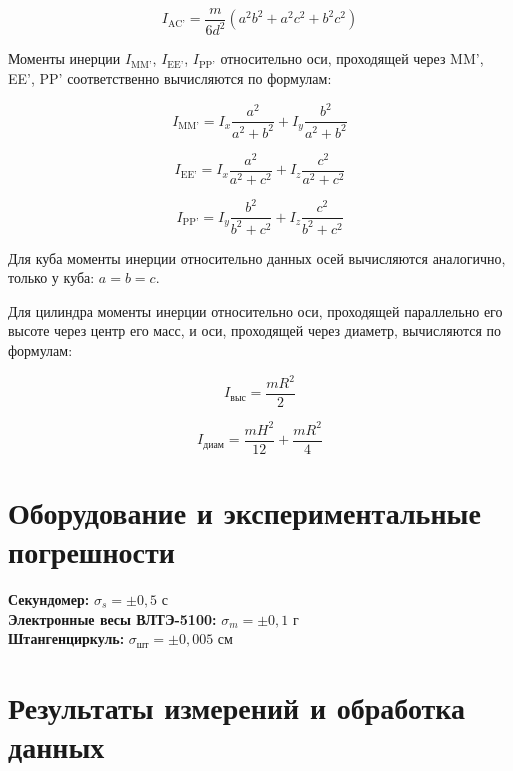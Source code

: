 \documentclass[a4paper, 12pt]{article}
\begin{document}
\begin{equation}\label{cilinder-AC}
    I_\text{AC'} = \frac{m}{6d^2} \left( a^2 b^2 + a^2 c^2 + b^2 c^2 \right)
\end{equation}

Моменты инерции $I_\text{MM'}$, $I_\text{EE'}$, $I_\text{PP'}$ относительно оси, проходящей через MM', EE', PP' соответственно вычисляются по формулам:

\begin{equation}\label{cilinder-MM}
    I_\text{MM'} = I_{x} \frac{a^2}{a^2 + b^2} + I_{y} \frac{b^2}{a^2 + b^2}
\end{equation}

\begin{equation}\label{cilinder-EE}
    I_\text{EE'} = I_{x} \frac{a^2}{a^2 + c^2} + I_{z} \frac{c^2}{a^2 + c^2}
\end{equation}

\begin{equation}\label{cilinder-PP}
    I_\text{PP'} = I_{y} \frac{b^2}{b^2 + c^2} + I_{z} \frac{c^2}{b^2 + c^2}
\end{equation}

Для куба моменты инерции относительно данных осей вычисляются аналогично, только у куба: $a = b = c$.


Для цилиндра моменты инерции относительно оси, проходящей параллельно его высоте через центр его масс, и оси, проходящей через диаметр, вычисляются по формулам: 

\begin{equation}\label{actual-cil-h}
    I_\text{выс} = \frac{mR^2}{2}
\end{equation}

\begin{equation}\label{actual-cil-d}
    I_\text{диам} = \frac{mH^2}{12} + \frac{mR^2}{4}
\end{equation}

\section{Оборудование и экспериментальные погрешности}

\textbf{Секундомер:} $\sigma_s = \pm 0,5$ с \\ 
\textbf{Электронные весы ВЛТЭ-5100:} $\sigma_m = \pm 0,1$ г \\
\textbf{Штангенциркуль:} $\sigma_\text{шт} = \pm 0,005$ см \\

\section{Результаты измерений и обработка данных}
\end{document}
